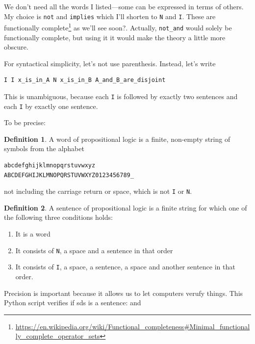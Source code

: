 \documentclass[11pt,oneside,%
]{memoir}
\theoremstyle{definition}
\newtheorem{maaritelma}{Definition}
\begin{document}
We don't need all the words I listed---some can be expressed in terms of others. My choice is \lstinline!not! and \lstinline!implies! which I'll shorten to \lstinline[language=propositio]!N! and \lstinline[language=propositio]!I!. These are functionally complete\footnote{\url{https://en.wikipedia.org/wiki/Functional_completeness\#Minimal_functionally_complete_operator_sets}} as we'll see soon?. Actually, \lstinline!not_and! would solely be functionally complete, but using it it would make the theory a little more obscure.

For syntactical simplicity, let's not use parenthesis. Instead, let's write
\begin{lstlisting}[language=propositio]
I I x_is_in_A N x_is_in_B A_and_B_are_disjoint
\end{lstlisting}
This is unambiguous, because each \lstinline[language=propositio]!I! is followed by exactly two sentences and each \lstinline[language=propositio]!I! by exactly one sentence.

To be precise:
\begin{maaritelma}
A word of propositional logic is a finite, non-empty string of symbols from the alphabet
\begin{lstlisting}
abcdefghijklmnopqrstuvwxyz
ABCDEFGHIJKLMNOPQRSTUVWXYZ0123456789_
\end{lstlisting}
not including the carriage return or space, which is not \lstinline[language=propositio]!I! or \lstinline[language=propositio]!N!.
\end{maaritelma}%
\begin{maaritelma}
A sentence of propositional logic is a finite string for which one of the following three conditions holds:
\begin{enumerate}
    \item It is a word
    \item It consists of \lstinline[language=propositio]!N!, a space and a sentence in that order
    \item It consists of \lstinline[language=propositio]!I!, a space, a sentence, a space and another sentence in that order.
\end{enumerate}
\end{maaritelma}
Precision is important because it allows us to let computers verufy things. This Python script verifies if sds is a sentence:
and 

%
\end{document}
